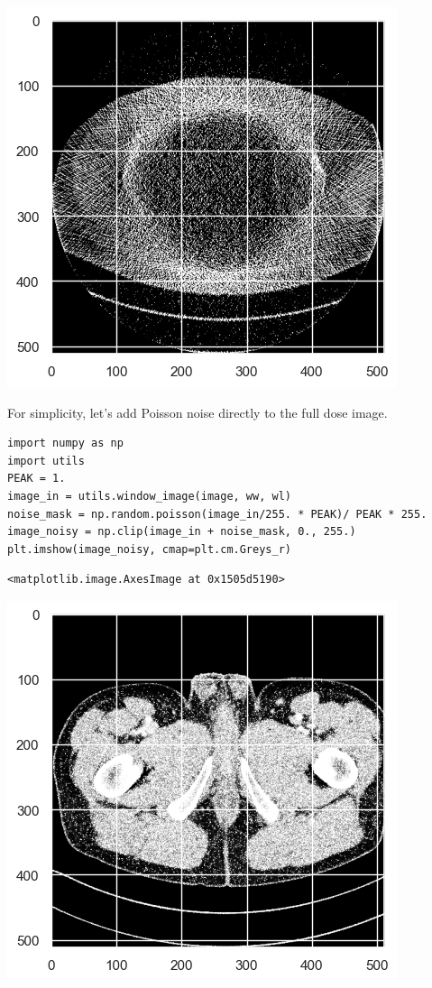 \documentclass[a4paper, 11pt]{article}
\begin{document}
\begin{center}
\includegraphics[width=.9\linewidth]{./.ob-jupyter/a2c5cd91c793b7ab083a82fbbf06731021691179.png}
\end{center}

For simplicity, let's add Poisson noise directly to the full dose image.
\begin{verbatim}
import numpy as np
import utils
PEAK = 1.
image_in = utils.window_image(image, ww, wl)
noise_mask = np.random.poisson(image_in/255. * PEAK)/ PEAK * 255.
image_noisy = np.clip(image_in + noise_mask, 0., 255.)
plt.imshow(image_noisy, cmap=plt.cm.Greys_r)
\end{verbatim}

\begin{verbatim}
<matplotlib.image.AxesImage at 0x1505d5190>
\end{verbatim}

\begin{center}
\includegraphics[width=.9\linewidth]{./.ob-jupyter/867b134dcccbb5541e76d3d5c51efc23c8aac807.png}
\end{center}
\end{document}
